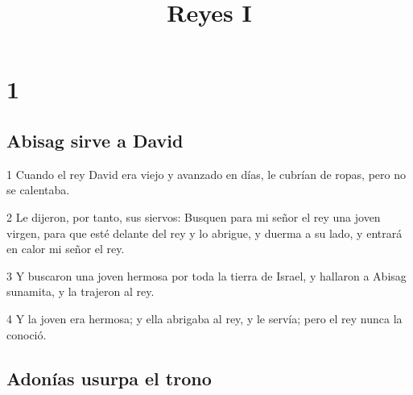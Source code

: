 

\title{Reyes I}

\chapter{1}

\section*{Abisag sirve a David}

\par 1 Cuando el rey David era viejo y avanzado en días, le cubrían de ropas, pero no se calentaba.
\par 2 Le dijeron, por tanto, sus siervos: Busquen para mi señor el rey una joven virgen, para que esté delante del rey y lo abrigue, y duerma a su lado, y entrará en calor mi señor el rey.
\par 3 Y buscaron una joven hermosa por toda la tierra de Israel, y hallaron a Abisag sunamita, y la trajeron al rey.
\par 4 Y la joven era hermosa; y ella abrigaba al rey, y le servía; pero el rey nunca la conoció.

\section*{Adonías usurpa el trono}

